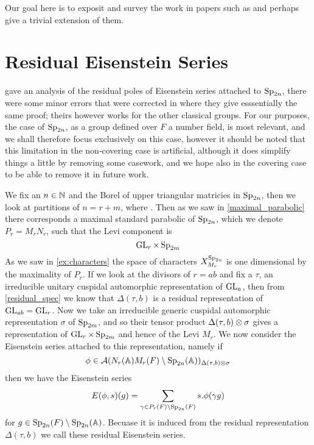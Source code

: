 Our goal here is to exposit and survey the work in papers such as \cite{brennerNotesAnalyticProperties2009}\cite{jiangPolesCertainResidual2013}\cite{ginzburgTopFourierCoefficients2021} and perhaps give a trivial extension of them.

\section{Residual Eisenstein Series}
\cite{brennerNotesAnalyticProperties2009} gave an analysis of the residual poles of Eisenstein series attached to \(\operatorname{Sp}_{2n}\), there were some minor errors that were corrected in \cite{jiangPolesCertainResidual2013} where they give esssentially the same proof; theirs however works for the other classical groups. For our purposes, the case of \(\operatorname{Sp}_{2n}\), as a group defined over \(F\) a number field, is most relevant, and we shall therefore focus exclusively on this case, however it should be noted that this limitation in the non-covering case is artificial, although it does simplify things a little by removing some casework, and we hope also in the covering case to be able to remove it in future work. 

We fix an \(n\in \N\) and the Borel of upper triangular matricies in \(\operatorname{Sp}_{2n} \), then we look at partitions of \(n = r + m\), where . Then as we saw in \ref{maximal_parabolic} there corresponds a maximal standard parabolic of \(\operatorname{Sp}_{2n}\), which we denote \(P_r = M_rN_r\), such that the Levi component is 
\[\operatorname{GL}_r\times \operatorname{Sp}_{2m} \]
As we saw in \ref{ex:characters} the space of characters \(X^{\operatorname{Sp}_{2n}}_{M_r}\) is one dimensional by the maximality of \(P_r\). If we look at the divisors of \(r = ab\)  and fix a \(\tau\), an irreducible unitary cuspidal automorphic representation of \(\operatorname{GL}_a\), then from \ref{residual_spec} we know that \(\Delta(\tau, b)\) is a residual representation of \(\operatorname{GL}_{ab} = \operatorname{GL}_r\). Now we take an irreducible generic cuspidal automorphic representation \(\sigma\) of \(\operatorname{Sp}_{2m}\), and so their tensor product \(\Delta(\tau, b) \otimes \sigma\) gives a representation of \(\operatorname{GL}_{r}\times \operatorname{Sp}_{2m}\) and hence of the Levi \(M_r\). We now consider the Eisenstein series attached to this representation, namely if 
\[\phi\in \mathcal{A}(N_r(\A)M_r(F)\setminus \Sp_{2n}(\A) )_{\Delta(\tau, b)\tensor \sigma}\] 
then we have the Eisenstein series
\[E(\phi, s)(g) = \sum_{\gamma\in P_r(F) \setminus \Sp_{2n}(F)} s.\phi(\gamma g)\]
for \(g\in \Sp_{2n}(F) \setminus \Sp_{2n}(\A)\). Becuase it is induced from the residual representation \(\Delta(\tau, b)\) we call these residual Eisenstein series.

